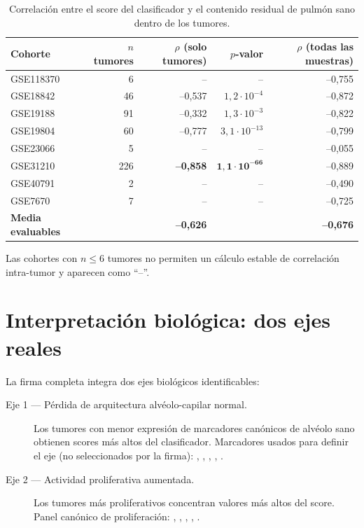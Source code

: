 \begin{table}[H]
  \centering
  \small
  \caption{Correlación entre el score del clasificador y el contenido
  residual de pulmón sano dentro de los tumores.}
  \label{tab:composicion}
  \begin{tabular}{lrrrr}
    \toprule
    \textbf{Cohorte} & $n$ tumores & $\rho$ (solo tumores) & $p$-valor & $\rho$ (todas las muestras) \\
    \midrule
    GSE118370 & 6   & --      & --                    & --0,755 \\
    GSE18842  & 46  & --0,537 & $1{,}2\cdot 10^{-4}$  & --0,872 \\
    GSE19188  & 91  & --0,332 & $1{,}3\cdot 10^{-3}$  & --0,822 \\
    GSE19804  & 60  & --0,777 & $3{,}1\cdot 10^{-13}$ & --0,799 \\
    GSE23066  & 5   & --      & --                    & --0,055 \\
    GSE31210  & 226 & \textbf{--0,858} & $\mathbf{1{,}1\cdot 10^{-66}}$ & --0,889 \\
    GSE40791  & 2   & --      & --                    & --0,490 \\
    GSE7670   & 7   & --      & --                    & --0,725 \\
    \midrule
    \textbf{Media evaluables} & & \textbf{--0,626} & & \textbf{--0,676} \\
    \bottomrule
  \end{tabular}

  \vspace{0.35em}
  {\footnotesize Las cohortes con $n \leq 6$ tumores no permiten un
  cálculo estable de correlación intra-tumor y aparecen como ``--''.}
\end{table}

\section{Interpretación biológica: dos ejes reales}
\label{sec:res_biologia}

La firma completa integra dos ejes biológicos identificables:

\begin{description}
  \item[Eje 1 — Pérdida de arquitectura alvéolo-capilar normal.] Los
  tumores con menor expresión de marcadores canónicos de alvéolo sano
  obtienen scores más altos del clasificador. Marcadores usados para
  definir el eje (no seleccionados por la firma): ,
  , , , .
  \item[Eje 2 — Actividad proliferativa aumentada.] Los tumores más
  proliferativos concentran valores más altos del score. Panel canónico de
  proliferación: , , , ,
  .
\end{description}


